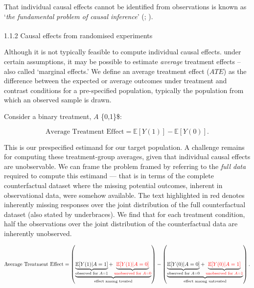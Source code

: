 \documentclass[
  single column]{article}
\makeatletter
\let\oldparagraph\paragraph
\renewcommand{\paragraph}{
    \@ifstar
      \xxxParagraphStar
      \xxxParagraphNoStar
  }
\newcommand{\xxxParagraphStar}[1]{\oldparagraph*{#1}\mbox{}}
\newcommand{\xxxParagraphNoStar}[1]{\oldparagraph{#1}\mbox{}}
\makeatother
\begin{document}
That individual causal effects cannot be identified from observations is
known as `\emph{the fundamental problem of causal inference}'
(;
).

\paragraph{1.1.2 Causal effects from randomised
experiments}\label{causal-effects-from-randomised-experiments}

Although it is not typically feasible to compute individual causal
effects. under certain assumptions, it may be possible to estimate
\emph{average} treatment effects -- also called `marginal effects.' We
define an average treatment effect (\(ATE\)) as the difference between
the expected or average outcomes under treatment and contrast conditions
for a pre-specified population, typically the population from which an
observed sample is drawn.

Consider a binary treatment, \(A\) \in \{0,1\}\$:

\[
\text{Average Treatment Effect}  = \mathbb{E}[Y(1)] - \mathbb{E}[Y(0)].
\]

This is our prespecified estimand for our target population. A challenge
remains for computing these treatment-group averages, given that
individual causal effects are unobservable. We can frame the problem
framed by referring to the \emph{full data} required to compute this
estimand --- that is in terms of the complete counterfactual dataset
where the missing potential outcomes, inherent in observational data,
were somehow available. The text highlighted in red denotes inherently
missing responses over the joint distribution of the full counterfactual
dataset (also stated by underbraces). We find that for each treatment
condition, half the observations over the joint distribution of the
counterfactual data are inherently unobserved.

\[
\text{Average Treatment Effect} = \left(\underbrace{\underbrace{\mathbb{E}[Y(1)|A = 1]}_{\text{observed for } A = 1} + \underbrace{\textcolor{red}{\mathbb{E}[Y(1)|A = 0]}}_{\textcolor{red}{\text{unobserved for } A = 0}}}_{\text{effect among treated}}\right) - \left(\underbrace{\underbrace{\mathbb{E}[Y(0)|A = 0]}_{\text{observed for } A = 0} + \underbrace{\textcolor{red}{\mathbb{E}[Y(0)|A = 1]}}_{\textcolor{red}{\text{unobserved for } A = 1}}}_{\text{effect among untreated}}\right).
\]
\end{document}
